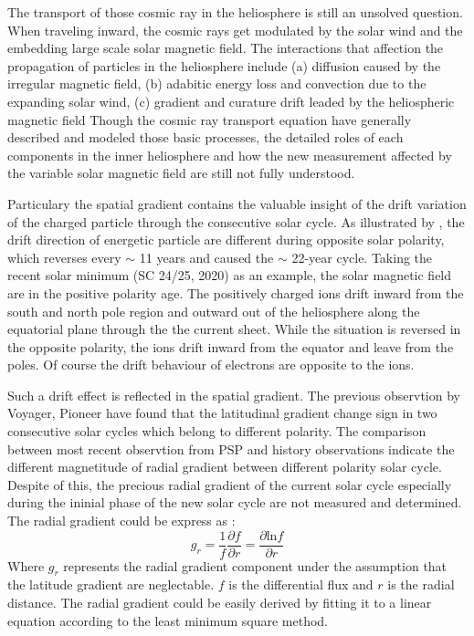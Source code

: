 The transport of those cosmic ray in the heliosphere is still an unsolved question. When traveling inward, the cosmic rays get modulated by the solar wind and the embedding large scale solar magnetic field. The interactions that affection the propagation of particles in the heliosphere include (a) diffusion caused by the irregular magnetic field, (b) adabitic energy loss and convection due to the expanding solar wind,  (c) gradient and curature drift leaded by the heliospheric magnetic field
Though the cosmic ray transport equation have generally described and modeled those basic processes, the detailed roles of each components in the inner heliosphere and how the new measurement affected by the variable solar magnetic field are still not fully understood. \citep{Rankin2021ApJ}

Particulary the spatial gradient contains the valuable insight of the drift variation of the charged particle through the consecutive solar cycle. As illustrated by \citet{Jokipii1977ApJ, Jokipii1979ApJ, Potgieter2013LRSP}, the drift direction of energetic particle are different during opposite solar polarity, which reverses every $\sim$ 11 years and caused the $\sim$ 22-year cycle. Taking the recent solar minimum (\ac{SC} 24/25, 2020) as an example, the solar magnetic field are in the positive polarity age. The positively charged ions drift inward from the south and north pole region and outward out of the heliosphere along the equatorial plane through the the current sheet. While the situation is reversed in the opposite polarity, the ions drift inward from the equator and leave from the poles. Of course the drift behaviour of electrons are opposite to the ions.

Such a drift effect is reflected in the spatial gradient. The previous observtion by Voyager, Pioneer have found that the latitudinal gradient change sign in two consecutive solar cycles which belong to different polarity.
The comparison between most recent observtion from \ac{PSP} and history observations indicate the different magnetitude of radial gradient between different polarity solar cycle. Despite of this, the precious radial gradient of the current solar cycle especially during the ininial phase of the new solar cycle are not measured and determined.
The radial gradient could be express as \cite{Rankin2021ApJ} :
\begin{equation}
    g_r = \frac{1}{f}\frac{\partial{f}}{\partial{r}} = \frac{\partial{\mathrm{ln} f}}{\partial{r}}
    \label{eq:radial_gradient}
\end{equation}
Where $g_r$ represents the radial gradient component under the assumption that the latitude gradient are neglectable. $f$ is the differential flux and $r$ is the radial distance. The radial gradient could be easily derived by fitting it to a linear equation according to the least minimum square method.


